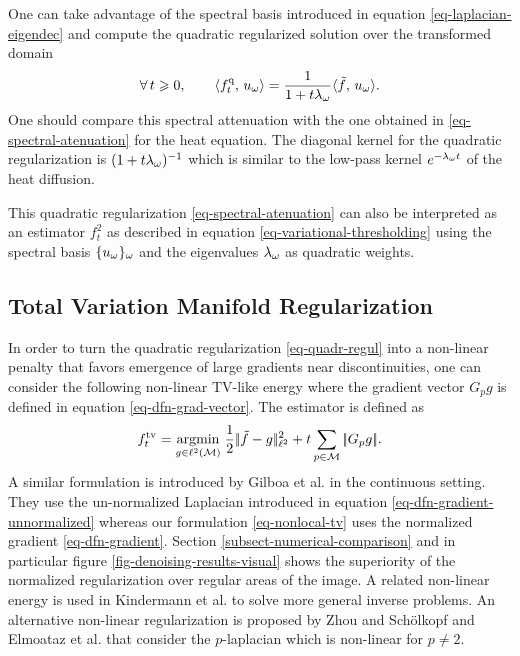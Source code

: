 \documentclass[final]{siamltex}
\newcommand{\tv}{\text{tv}}
\newcommand{\quadra}{\text{q}}
\newcommand{\F}{f}
\newcommand{\tF}{\tilde \F}
\begin{document}
One can take advantage of the spectral basis introduced in equation \eqref{eq-laplacian-eigendec} and compute the quadratic regularized solution over the transformed domain
\begin{equation*}
	\foralls t\geq 0, \qquad 
	\dotp{\F_t^{\quadra}}{u_\om} = \frac{1}{1+t\la_\om} \dotp{\tF}{u_\om}. 
\end{equation*}
One should compare this spectral attenuation with the one obtained in \eqref{eq-spectral-atenuation} for the heat equation. The diagonal kernel for the quadratic regularization is $(1+t\lambda_\omega)^{-1}$ which is similar to the low-pass kernel  $e^{-\lambda_\omega t}$ of the heat diffusion. 

This quadratic regularization \eqref{eq-spectral-atenuation} can also be interpreted as an estimator $\F_t^2$ as described in equation \eqref{eq-variational-thresholding} using the spectral basis $\{u_\omega\}_\omega$ and the eigenvalues $\lambda_\omega$ as quadratic weights.


 
\subsection{Total Variation Manifold Regularization}
\label{subsect-total-variation-graph}

In order to turn the quadratic regularization \eqref{eq-quadr-regul} into a non-linear penalty that favors emergence of large gradients near discontinuities, one can consider the following non-linear TV-like energy
\eq{
	\foralls g \in \ldeux(\Mm), \quad
	\energy_{\F}^{\tv}(g) = \sum_{p \in \Mm} \norm{G_p g}_{\ldeux},
}
where the gradient vector $G_p g$ is defined in equation \eqref{eq-dfn-grad-vector}.
The estimator is defined as
\begin{equation}
	\label{eq-nonlocal-tv}
	\F_t^{\tv} = \uargmin{g \in \ldeux(\Mm)} \frac{1}{2}\norm{\tF-g}_{\ldeux}^2 + t 
	\sum_{p \in \Mm} \norm{ G_p g }.
\end{equation}
A similar formulation is introduced by Gilboa et al. \cite{gilboa-nonlocal-functionals} in the continuous setting. They use the un-normalized Laplacian introduced in equation \eqref{eq-dfn-gradient-unnormalized} whereas our formulation \eqref{eq-nonlocal-tv} uses the normalized gradient \eqref{eq-dfn-gradient}. Section \ref{subsect-numerical-comparison} and in particular figure \ref{fig-denoising-results-visual} shows the superiority of the normalized regularization over regular areas of the image. A related non-linear energy is used in Kindermann et al. \cite{kindermann-nonlocal-functionals} to solve more general inverse problems. An alternative non-linear regularization is proposed by  Zhou and Sch\"{o}lkopf \cite{zhou-regularization-discrete} and Elmoataz et al. \cite{elmoataz-nonlocal} that consider the $p$-laplacian which is non-linear for $p \neq 2$.
\end{document}
